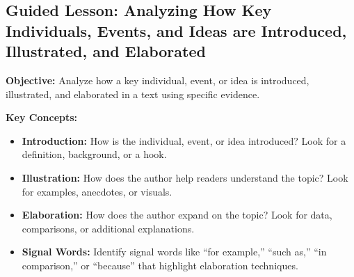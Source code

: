 \documentclass[12pt]{article}
\begin{document}
\subsection*{Guided Lesson: Analyzing How Key Individuals, Events, and Ideas are Introduced, Illustrated, and Elaborated}
\onehalfspacing

\begin{tcolorbox}[colframe=black!40, colback=gray!5, 
coltitle=black, colbacktitle=black!20, fonttitle=\bfseries\Large, 
title=Learning Objective, halign title=center, left=5pt, right=5pt, top=5pt, bottom=15pt]
\textbf{Objective:} Analyze how a key individual, event, or idea is introduced, illustrated, and elaborated in a text using specific evidence.
\end{tcolorbox}

\vspace{1em}

\begin{tcolorbox}[colframe=black!60, colback=white, 
coltitle=black, colbacktitle=black!15, fonttitle=\bfseries\Large, 
title=Key Concepts and Vocabulary, halign title=center, left=10pt, right=10pt, top=10pt, bottom=15pt]
\textbf{Key Concepts:}
\begin{itemize}
    \item \textbf{Introduction:} How is the individual, event, or idea introduced? Look for a definition, background, or a hook.
    \item \textbf{Illustration:} How does the author help readers understand the topic? Look for examples, anecdotes, or visuals.
    \item \textbf{Elaboration:} How does the author expand on the topic? Look for data, comparisons, or additional explanations.
    \item \textbf{Signal Words:} Identify signal words like “for example,” “such as,” “in comparison,” or “because” that highlight elaboration techniques.
\end{itemize}
\end{tcolorbox}

\vspace{1em}
\end{document}
